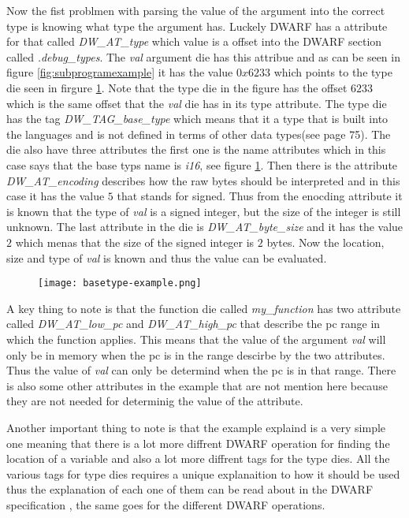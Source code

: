 Now the fist problmen with parsing the value of the argument into the correct type is knowing what type the argument has.
Luckely \gls{DWARF} has a attribute for that called \emph{DW\_AT\_type} which value is a offset into the \gls{DWARF} section called \emph{.debug\_types}.
The \emph{val} argument \gls{die} has this attribue and as can be seen in figure \ref{fig:subprogramexample} it has the value $0x6233$ which points to the type \gls{die} seen in firgure \ref{fig:basetypeexample}.
Note that the type \gls{die} in the figure has the offset $6233$ which is the same offset that the \emph{val} \gls{die} has in its type attribute.
The type \gls{die} has the tag \emph{DW\_TAG\_base\_type} which means that it a type that is built into the languages and is not defined in terms of other data types(see \cite{dwarf} page 75).
The \gls{die} also have three attributes the first one is the name attributes which in this case says that the base typs name is \emph{i16}, see figure \ref{fig:basetypeexample}.
Then there is the attribute \emph{DW\_AT\_encoding} describes how the raw bytes should be interpreted and in this case it has the value $5$ that stands for signed.
Thus from the enocding attribute it is known that the type of \emph{val} is a signed integer, but the size of the integer is still unknown.
The last attribute in the \gls{die} is \emph{DW\_AT\_byte\_size} and it has the value $2$ which menas that the size of the signed integer is $2$ bytes.
Now the location, size and type of \emph{val} is known and thus the value can be evaluated.


\begin{figure}[h]
    \centering
    \texttt{[image: basetype-example.png]}
    \label{fig:basetypeexample}
\end{figure}


A key thing to note is that the function \gls{die} called \emph{my\_function} has two attribute called \emph{DW\_AT\_low\_pc} and \emph{DW\_AT\_high\_pc} that describe the \gls{pc} range in which the function applies.
This means that the value of the argument \emph{val} will only be in memory when the \gls{pc} is in the range descirbe by the two attributes.
Thus the value of \emph{val} can only be determind when the \gls{pc} is in that range.
There is also some other attributes in the example that are not mention here because they are not needed for determinig the value of the attribute.

Another important thing to note is that the example explaind is a very simple one meaning that there is a lot more diffrent \gls{DWARF} operation for finding the location of a variable and also a lot more diffrent tags for the type \glspl{die}.
All the various tags for type dies requires a unique explanaition to how it should be used thus the explanation of each one of them can be read about in the \gls{DWARF} specification \cite{dwarf}, the same goes for the different \gls{DWARF} operations.

